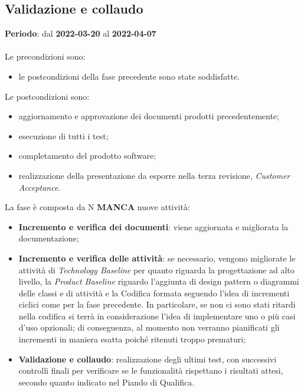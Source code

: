 \subsection{Validazione e collaudo}
\textbf{Periodo}: dal \textbf{2022-03-20} al \textbf{2022-04-07} \mbox{} \\ \mbox{} \\

Le precondizioni sono:
\begin{itemize}
\item le postcondizioni della fase precedente sono state soddisfatte.
\end{itemize}

Le postcondizioni sono:
\begin{itemize}
\item aggiornamento e approvazione dei documenti prodotti precedentemente;
\item esecuzione di tutti i test;
\item completamento del prodotto software;
\item realizzazione della presentazione da esporre nella terza revisione, \textit{Customer Acceptance}. 
\end{itemize}

La fase è composta da N \textbf{MANCA} nuove attività:
\begin{itemize}
\item \textbf{Incremento e verifica dei documenti}: viene aggiornata e migliorata la documentazione;
\item \textbf{Incremento e verifica delle attività}: se necessario, vengono migliorate le attività di \textit{Technology Baseline} per quanto riguarda la progettazione ad alto livello, la \textit{Product Baseline} riguardo l’aggiunta di design pattern o diagrammi delle classi e di attività e la Codifica formata seguendo l’idea di incrementi ciclici come per la fase precedente. In particolare,  se non ci sono stati ritardi nella codifica si terrà in considerazione l’idea di implementare uno o più casi d’uso opzionali; di conseguenza,  al momento non verranno pianificati gli incrementi in maniera esatta poiché ritenuti troppo prematuri;
\item \textbf{Validazione e collaudo}: realizzazione degli ultimi test, con successivi controlli finali per verificare se le funzionalità rispettano i risultati attesi,  secondo quanto indicato nel Piando di Qualifica.
\end{itemize}

